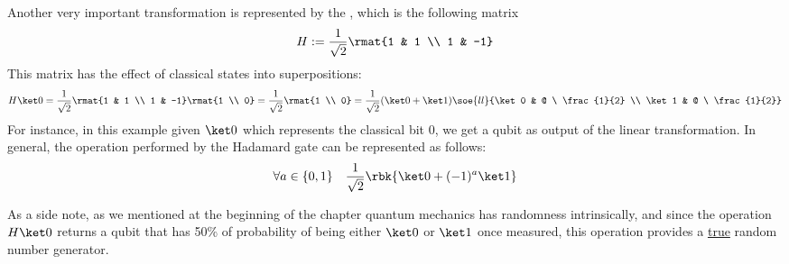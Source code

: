 \documentclass[a4paper, 12pt]{report}
\begin{document}
Another very important transformation is represented by the , which is the following matrix $$H := \dfrac{1}{\sqrt 2}\rmat{1 & 1 \\ 1 & -1}$$ This matrix has the effect of  classical states into superpositions: $$H \ket 0 = \dfrac{1}{\sqrt 2}\rmat{1 & 1 \\ 1 & -1} \rmat{1 \\ 0} = \dfrac{1}{\sqrt 2} \rmat{1 \\ 0} = \dfrac{1}{\sqrt 2} (\ket 0 + \ket 1) \soe{ll}{\ket 0 & @ \  \frac{1}{2} \\ \ket 1 & @ \  \frac{1}{2}}$$ For instance, in this example given $\ket 0$ which represents the classical bit 0, we get a qubit as output of the linear transformation. In general, the operation performed by the Hadamard gate can be represented as follows: $$\forall a \in \{0, 1\} \quad \dfrac{1}{\sqrt 2} \rbk{\ket 0 + (-1)^a \ket 1}$$

As a side note, as we mentioned at the beginning of the chapter quantum mechanics has randomness intrinsically, and since the operation $H \ket 0$ returns a qubit that has 50\% of probability of being either $\ket 0$ or $\ket 1$ once measured, this operation provides a \underline{true} random number generator.
\end{document}
